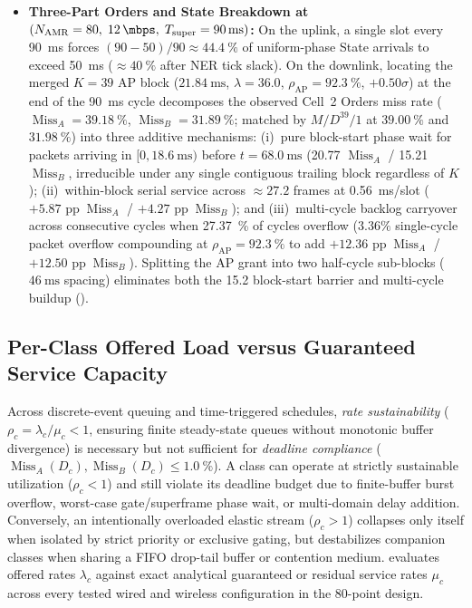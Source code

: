 \documentclass[11pt,a4paper]{article}
\newcommand{\Namr}{\ensuremath{N_{\mathrm{AMR}}}}
\newcommand{\Tsuper}{\ensuremath{T_{\mathrm{super}}}}
\newcommand{\MissA}{\ensuremath{\operatorname{Miss}_A}}
\newcommand{\MissB}{\ensuremath{\operatorname{Miss}_B}}
\begin{document}
\begin{itemize}[leftmargin=1.8em]
    \item \textbf{Three-Part Orders and State Breakdown at $(\Namr=80,\; \qty{12}{\mbps},\; \Tsuper=\qty{90}{\milli\second})$:} On the uplink, a single slot every \qty{90}{\milli\second} forces $(90-50)/90 \approx \qty{44.4}{\percent}$ of uniform-phase State arrivals to exceed \qty{50}{\milli\second} ($\approx \qty{40}{\percent}$ after NER tick slack). On the downlink, locating the merged $K=39$ AP block ($\qty{21.84}{\milli\second}$, $\lambda = 36.0$, $\rho_{\mathrm{AP}} = \qty{92.3}{\percent}$, $+0.50\sigma$) at the end of the \qty{90}{\milli\second} cycle decomposes the observed Cell~2 Orders miss rate ($\MissA = \qty{39.18}{\percent}$, $\MissB = \qty{31.89}{\percent}$; matched by $M/D^{39}/1$ at $\qty{39.00}{\percent}$ and $\qty{31.98}{\percent}$) into three additive mechanisms: (i)~pure block-start phase wait for packets arriving in $[0, \qty{18.6}{\milli\second})$ before $t=\qty{68.0}{\milli\second}$ (\qty{20.77}{\pp} $\MissA$ / \qty{15.21}{\pp} $\MissB$, irreducible under any single contiguous trailing block regardless of $K$); (ii)~within-block serial service across $\approx 27.2$ frames at \qty{0.56}{\milli\second}/slot ($+5.87\text{ pp}\; \MissA$ / $+4.27\text{ pp}\; \MissB$); and (iii)~multi-cycle backlog carryover across consecutive cycles when \qty{27.37}{\percent} of cycles overflow ($3.36\%$ single-cycle packet overflow compounding at $\rho_{\mathrm{AP}}=\qty{92.3}{\percent}$ to add $+12.36\text{ pp}\; \MissA$ / $+12.50\text{ pp}\; \MissB$). Splitting the AP grant into two half-cycle sub-blocks ($\qty{46}{\milli\second}$ spacing) eliminates both the \qty{15.2}{\pp} block-start barrier and multi-cycle buildup ().
\end{itemize}

\subsection{Per-Class Offered Load versus Guaranteed Service Capacity}
\label{sec:capacity_proof}

Across discrete-event queuing and time-triggered schedules, \emph{rate sustainability} ($\rho_c = \lambda_c / \mu_c < 1$, ensuring finite steady-state queues without monotonic buffer divergence) is necessary but not sufficient for \emph{deadline compliance} ($\MissA(D_c), \MissB(D_c) \le \qty{1.0}{\percent}$). A class can operate at strictly sustainable utilization ($\rho_c < 1$) and still violate its deadline budget due to finite-buffer burst overflow, worst-case gate/superframe phase wait, or multi-domain delay addition. Conversely, an intentionally overloaded elastic stream ($\rho_c > 1$) collapses only itself when isolated by strict priority or exclusive gating, but destabilizes companion classes when sharing a FIFO drop-tail buffer or contention medium.  evaluates offered rates $\lambda_c$ against exact analytical guaranteed or residual service rates $\mu_c$ across every tested wired and wireless configuration in the $80$-point design.
\end{document}
